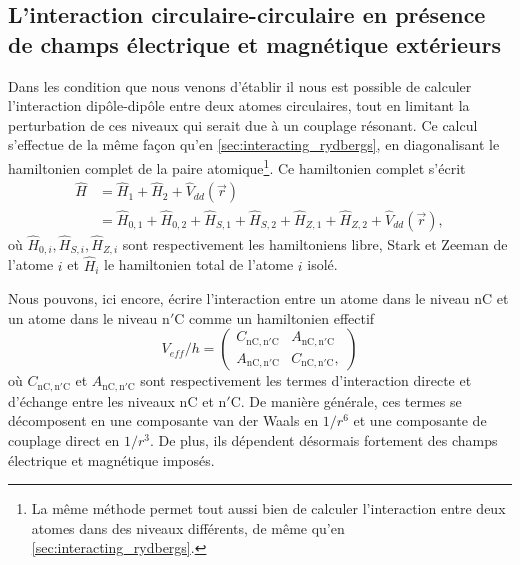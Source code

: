 \subsection{L'interaction circulaire-circulaire en présence de champs électrique et magnétique extérieurs}
\noindent Dans les condition que nous venons d'établir il nous est possible de calculer l'interaction dipôle-dipôle entre deux atomes circulaires, tout en limitant la perturbation de ces niveaux qui serait due à un couplage résonant.
Ce calcul s'effectue de la même façon qu'en \ref{sec:interacting_rydbergs}, en diagonalisant le hamiltonien complet de la paire atomique\footnote{
La même méthode permet tout aussi bien de calculer l'interaction entre deux atomes dans des niveaux différents, de même qu'en \ref{sec:interacting_rydbergs}.
}.
Ce hamiltonien complet s'écrit
\begin{equation}
\label{eq:hamilt_Vdd_ZeeStark}
\begin{aligned}
\hat{H} &= \hat{H}_1 + \hat{H}_2 + \hat{V}_{dd}(\vec{r}) \\
 &= \hat{H}_{0,1} + \hat{H}_{0,2} + \hat{H}_{S,1} + \hat{H}_{S,2} + \hat{H}_{Z,1} + \hat{H}_{Z,2} + \hat{V}_{dd}(\vec{r}),
\end{aligned}
\end{equation}
où $\hat{H}_{0,i},\hat{H}_{S,i},\hat{H}_{Z,i}$ sont respectivement les hamiltoniens libre, Stark et Zeeman de l'atome $i$ et $\hat{H}_i$ le hamiltonien total de l'atome $i$ isolé.

Nous pouvons, ici encore, écrire l'interaction entre un atome dans le niveau $\mathrm{nC}$ et un atome dans le niveau $\mathrm{n'C}$ comme un hamiltonien effectif
\begin{equation}
\label{eq:Veff_nCn'C}
V_{eff}/h = \left(\begin{array}{cc}
C_{\mathrm{nC},\mathrm{n'C}} & A_{\mathrm{nC},\mathrm{n'C}} \\
A_{\mathrm{nC},\mathrm{n'C}} & C_{\mathrm{nC},\mathrm{n'C}},
\end{array} \right)
\end{equation}
où $C_{\mathrm{nC},\mathrm{n'C}}$ et $A_{\mathrm{nC},\mathrm{n'C}}$ sont respectivement les termes d'interaction directe et d'échange entre les niveaux $\mathrm{nC}$ et $\mathrm{n'C}$.
De manière générale, ces termes se décomposent en une composante \og van der Waals \fg{} en $1/r^6$ et une composante de couplage direct en $1/r^3$.
De plus, ils dépendent désormais fortement des champs électrique et magnétique imposés.

